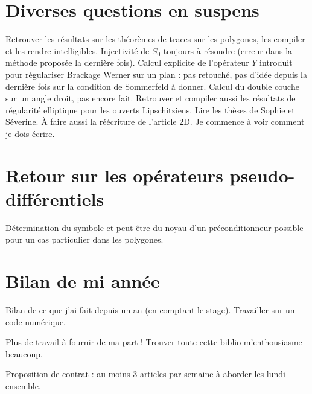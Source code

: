 \documentclass[11pt,a4paper]{article}
\begin{document}
\section{Diverses questions en suspens}

Retrouver les résultats sur les théorèmes de traces sur les polygones, les compiler et les rendre intelligibles. 
Injectivité de $S_0$ toujours à résoudre (erreur dans la méthode proposée la dernière fois). 
Calcul explicite de l'opérateur $Y$ introduit pour régulariser Brackage Werner sur un plan : pas retouché, pas d'idée depuis la dernière fois sur la condition de Sommerfeld à donner. 
Calcul du double couche sur un angle droit, pas encore fait.
Retrouver et compiler aussi les résultats de régularité elliptique pour les ouverts Lipschitziens. 
Lire les thèses de Sophie et Séverine. 
À faire aussi la réécriture de l'article 2D. Je commence à voir comment je dois écrire. 

\section{Retour sur les opérateurs pseudo-différentiels}

Détermination du symbole et peut-être du noyau d'un préconditionneur possible pour un cas particulier dans les polygones. 

\section{Bilan de mi année}

Bilan de ce que j'ai fait depuis un an (en comptant le stage). 
Travailler sur un code numérique. 

Plus de travail à fournir de ma part ! Trouver toute cette biblio m'enthousiasme beaucoup. 

Proposition de contrat : au moins 3 articles par semaine à aborder les lundi ensemble. 


\nocite{sauter2011boundary}
\nocite{mclean2000strongly}

 
\end{document}
